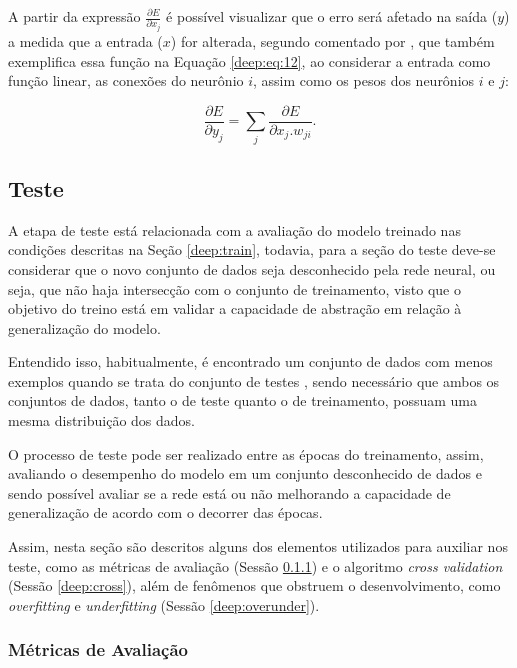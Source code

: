 A partir da expressão $\frac{\partial E}{\partial x_j}$ é possível visualizar que o erro será afetado na saída ($y$) a medida que a entrada ($x$) for alterada, segundo comentado por \cite{rumelhart1986learning}, que também exemplifica essa função na Equação \ref{deep:eq:12}, ao considerar a entrada como função linear, as conexões do neurônio $i$, assim como os pesos dos neurônios $i$ e $j$:

\begin{equation}
    \label{deep:eq:12}
    \frac{\partial E}{\partial y_j} = \sum_j \frac{\partial E}{\partial x_j . w_{ji}}.
\end{equation}


\subsection{Teste}
\label{deep:test}

A etapa de teste está relacionada com a avaliação do modelo treinado nas condições descritas na Seção \ref{deep:train}, todavia, para a seção do teste deve-se considerar que o novo conjunto de dados seja desconhecido pela rede neural, ou seja, que não haja intersecção com o conjunto de treinamento, visto que o objetivo do treino está em validar a capacidade de abstração em relação à generalização do modelo.

Entendido isso, habitualmente, é encontrado um conjunto de dados com menos exemplos quando se trata do conjunto de testes \citep{Goodfellow2016}, sendo necessário que ambos os conjuntos de dados, tanto o de teste quanto o de treinamento, possuam uma mesma distribuição dos dados.

O processo de teste pode ser realizado entre as épocas do treinamento, assim, avaliando o desempenho do modelo em um conjunto desconhecido de dados e sendo possível avaliar se a rede está ou não melhorando a capacidade de generalização de acordo com o decorrer das épocas.

Assim, nesta seção são descritos alguns dos elementos utilizados para auxiliar nos teste, como as métricas de avaliação (Sessão \ref{deep:metrics}) e o algoritmo \textit{cross validation} (Sessão \ref{deep:cross}), além de fenômenos que obstruem o desenvolvimento, como \textit{overfitting} e \textit{underfitting} (Sessão \ref{deep:overunder}).


\subsubsection{Métricas de Avaliação}
\label{deep:metrics}

